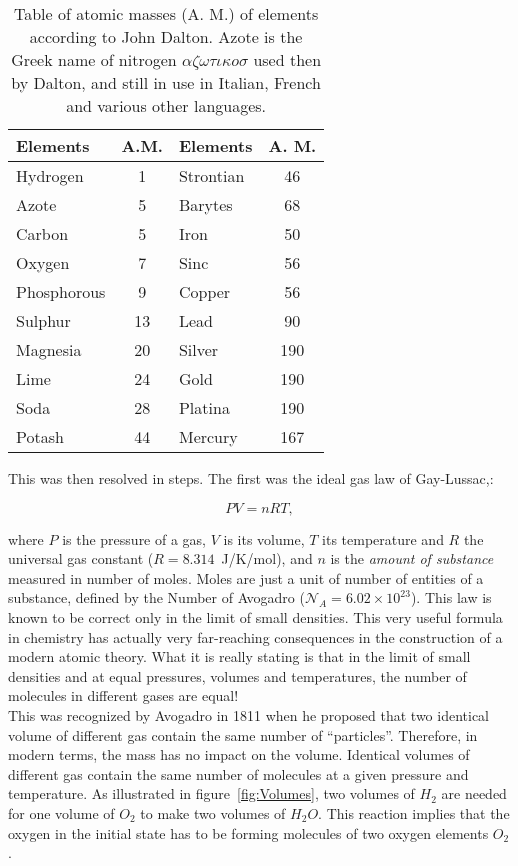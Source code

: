\begin{table}[h]
    \centering
    \begin{tabular}{l c | l c}
    \hline \hline
    Elements & A.M. & Elements & A. M. \\ \hline
    Hydrogen & 1    & Strontian & 46 \\
    Azote  & 5      & Barytes   & 68 \\
    Carbon  & 5     & Iron      & 50 \\
    Oxygen & 7      & Sinc      & 56 \\
    Phosphorous & 9 & Copper    & 56 \\
    Sulphur & 13    & Lead      & 90 \\
    Magnesia & 20   & Silver    & 190 \\
    Lime & 24       & Gold      & 190 \\
    Soda & 28       & Platina   & 190 \\
    Potash & 44     & Mercury   & 167 \\
                 \hline \hline
    \end{tabular}
    \caption{Table of atomic masses (A. M.) of elements according to John Dalton. Azote is the Greek name of nitrogen $\alpha\zeta\omega\tau\iota\kappa o \sigma$ used then by Dalton, and still in use in Italian, French and various other languages.}
    \label{tab:DaltonElements}
\end{table}

This was then resolved in steps. The first was the ideal gas law of Gay-Lussac,:

$$PV = nRT,$$

\noindent where $P$ is the pressure of a gas, $V$ is its volume, $T$ its temperature and $R$ the universal gas constant ($R=8.314$~J/K/mol), and $n$ is the {\it amount of substance} measured in number of moles. Moles are just a unit of number of entities of a substance, defined by the Number of Avogadro (${\mathcal N}_A = 6.02 \times 10^{23}$). This law is known to be correct only in the limit of small densities. This very useful formula in chemistry has actually very far-reaching consequences in the construction of a modern atomic theory. What it is really stating is that in the limit of small densities and at equal pressures, volumes and temperatures, the number of molecules in different gases are equal! \\

This was recognized by Avogadro in 1811 when he proposed that two identical volume of different gas contain the same number of
``particles''. Therefore, in modern terms, the mass has no impact on the volume. Identical volumes of different gas contain the same number of molecules at a given pressure and temperature. As illustrated in figure~\ref{fig:Volumes}, two volumes of $H_2$ are needed for one volume of $O_2$ to make two volumes of $H_2O$. This reaction implies that the oxygen in the initial state has to be forming molecules of two oxygen elements $O_2$. \\
	
